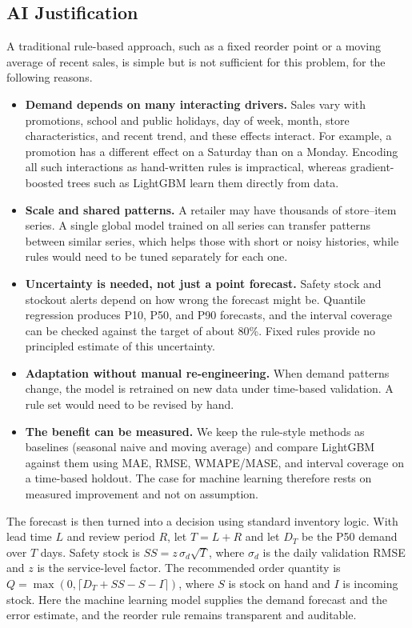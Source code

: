 \subsection{AI Justification}
A traditional rule-based approach, such as a fixed reorder point or a moving average of recent sales, is simple but is not sufficient for this problem, for the following reasons.

\begin{itemize}
    \item \textbf{Demand depends on many interacting drivers.} Sales vary with promotions, school and public holidays, day of week, month, store characteristics, and recent trend, and these effects interact. For example, a promotion has a different effect on a Saturday than on a Monday. Encoding all such interactions as hand-written rules is impractical, whereas gradient-boosted trees such as LightGBM learn them directly from data.
    \item \textbf{Scale and shared patterns.} A retailer may have thousands of store--item series. A single global model trained on all series can transfer patterns between similar series, which helps those with short or noisy histories, while rules would need to be tuned separately for each one.
    \item \textbf{Uncertainty is needed, not just a point forecast.} Safety stock and stockout alerts depend on how wrong the forecast might be. Quantile regression produces P10, P50, and P90 forecasts, and the interval coverage can be checked against the target of about 80\%. Fixed rules provide no principled estimate of this uncertainty.
    \item \textbf{Adaptation without manual re-engineering.} When demand patterns change, the model is retrained on new data under time-based validation. A rule set would need to be revised by hand.
    \item \textbf{The benefit can be measured.} We keep the rule-style methods as baselines (seasonal naive and moving average) and compare LightGBM against them using MAE, RMSE, WMAPE/MASE, and interval coverage on a time-based holdout. The case for machine learning therefore rests on measured improvement and not on assumption.
\end{itemize}

The forecast is then turned into a decision using standard inventory logic. With lead time $L$ and review period $R$, let $T = L + R$ and let $D_T$ be the P50 demand over $T$ days. Safety stock is $SS = z\,\sigma_d\sqrt{T}$, where $\sigma_d$ is the daily validation RMSE and $z$ is the service-level factor. The recommended order quantity is $Q = \max(0, \lceil D_T + SS - S - I \rceil)$, where $S$ is stock on hand and $I$ is incoming stock. Here the machine learning model supplies the demand forecast and the error estimate, and the reorder rule remains transparent and auditable.

